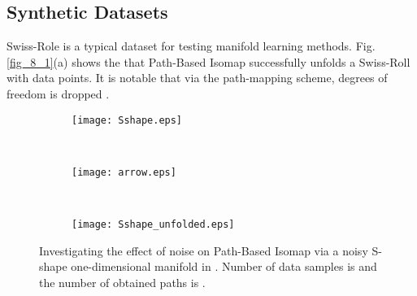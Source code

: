 \documentclass[10pt,journal,cspaper,compsoc]{IEEEtran}
\let\MYoriglatexcaption\caption
\renewcommand{\caption}[2][\relax]{\MYoriglatexcaption[#2]{#2}}
\begin{document}
\subsection{Synthetic Datasets}
Swiss-Role is a typical dataset for testing manifold learning methods. Fig.\ref{fig_8_1}(a) shows the that Path-Based Isomap successfully unfolds a Swiss-Roll with  data points. It is notable that via the path-mapping scheme, degrees of freedom is dropped . 

\begin{figure}[b]
\centering
        \begin{subfigure}[b]{0.35\textwidth}
                \texttt{[image: Sshape.eps]}
\end{subfigure}\\ \vspace{1mm}
        \begin{subfigure}[b]{0.2\textwidth}
        \begin{center}
                \texttt{[image: arrow.eps]}
\end{center}
        \end{subfigure}\\\begin{subfigure}[b]{0.35\textwidth}
                \texttt{[image: Sshape\_unfolded.eps]}
        \end{subfigure}\label{fig_Sshape}
        \vspace{5mm}
        \caption{{\small Investigating the effect of noise on Path-Based Isomap via a noisy S-shape one-dimensional manifold in . Number of data samples is  and the number of obtained paths is .}}
\end{figure}
\end{document}

